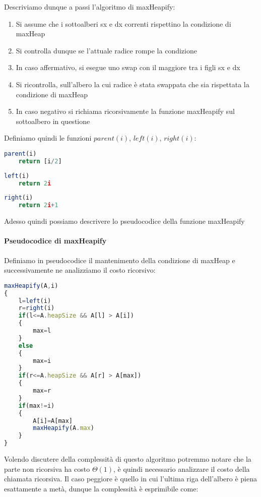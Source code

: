\documentclass{article}
\begin{document}
Descriviamo dunque a passi l'algoritmo di maxHeapify:

\begin{enumerate}
    \item Si assume che i sottoalberi sx e dx correnti rispettino la condizione di maxHeap
    \item Si controlla dunque se l'attuale radice rompe la condizione
    \item In caso affermativo, si esegue uno swap con il maggiore tra i figli sx e dx
    \item Si ricontrolla, sull'albero la cui radice è stata swappata che sia rispettata la condizione di maxHeap
    \item In caso negativo si richiama ricorsivamente la funzione maxHeapify sul sottoalbero in questione
\end{enumerate}

Definiamo quindi le funzioni $parent(i)$, $left(i)$, $right(i)$:

\begin{lstlisting}[language=JavaScript]
parent(i)
    return [i/2]
\end{lstlisting}

\begin{lstlisting}[language=JavaScript]
left(i)
    return 2i
\end{lstlisting}

\begin{lstlisting}[language=JavaScript]
right(i)
    return 2i+1
\end{lstlisting}

Adesso quindi possiamo descrivere lo pseudocodice della funzione maxHeapify

\newpage

\paragraph{Pseudocodice di maxHeapify} Definiamo in pseudocodice il mantenimento della condizione di maxHeap e successivamente ne analizziamo il costo ricorsivo:

\begin{lstlisting}[language=JavaScript]
maxHeapify(A,i)
{
	l=left(i)
	r=right(i)
	if(l<=A.heapSize && A[l] > A[i])
	{
		max=l
	}
	else
	{
		max=i
	}
	if(r<=A.heapSize && A[r] > A[max])
	{
		max=r
	}
	if(max!=i)
	{
		A[i]=A[max]
		maxHeapify(A.max)
	}
}

\end{lstlisting}

Volendo discutere della complessità di questo algoritmo potremmo notare che la parte non ricorsiva ha costo $\Theta(1)$, è quindi necessario analizzare il costo della chiamata ricorsiva. Il caso peggiore è quello in cui l'ultima riga dell'albero è piena esattamente a metà, dunque la complessità è esprimibile come:
\end{document}
